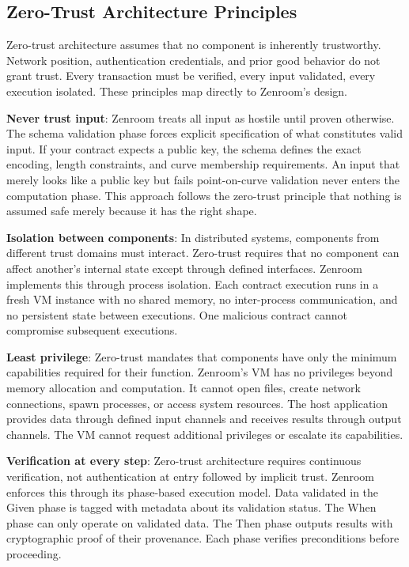 \subsection{Zero-Trust Architecture Principles}

Zero-trust architecture assumes that no component is inherently
trustworthy. Network position, authentication credentials, and prior
good behavior do not grant trust. Every transaction must be verified,
every input validated, every execution isolated. These principles map
directly to Zenroom's design.

\textbf{Never trust input}: Zenroom treats all input as hostile until
proven otherwise. The schema validation phase forces explicit
specification of what constitutes valid input. If your contract
expects a public key, the schema defines the exact encoding, length
constraints, and curve membership requirements. An input that merely
looks like a public key but fails point-on-curve validation never
enters the computation phase. This approach follows the zero-trust
principle that nothing is assumed safe merely because it has the right
shape.

\textbf{Isolation between components}: In distributed systems,
components from different trust domains must interact. Zero-trust
requires that no component can affect another's internal state except
through defined interfaces. Zenroom implements this through process
isolation. Each contract execution runs in a fresh VM instance with no
shared memory, no inter-process communication, and no persistent state
between executions. One malicious contract cannot compromise
subsequent executions.

\textbf{Least privilege}: Zero-trust mandates that components have
only the minimum capabilities required for their function. Zenroom's
VM has no privileges beyond memory allocation and computation. It
cannot open files, create network connections, spawn processes, or
access system resources. The host application provides data through
defined input channels and receives results through output
channels. The VM cannot request additional privileges or escalate its
capabilities.

\textbf{Verification at every step}: Zero-trust architecture requires
continuous verification, not authentication at entry followed by
implicit trust. Zenroom enforces this through its phase-based
execution model. Data validated in the Given phase is tagged with
metadata about its validation status. The When phase can only operate
on validated data. The Then phase outputs results with cryptographic
proof of their provenance. Each phase verifies preconditions before
proceeding.

